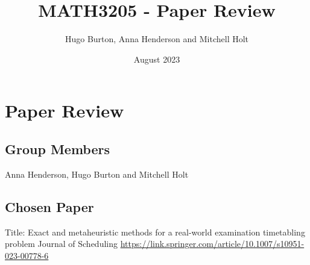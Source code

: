 \usepackage{geometry}
\setlength{\parindent}{0pt}
\title{MATH3205 - Paper Review}
\author{Hugo Burton, Anna Henderson and Mitchell Holt}
\date{August 2023}



\maketitle

\section{Paper Review}

\subsection{Group Members}
Anna Henderson, Hugo Burton and Mitchell Holt

\subsection{Chosen Paper}
Title: Exact and metaheuristic methods for a real-world examination timetabling problem
Journal of Scheduling
\url{https://link.springer.com/article/10.1007/s10951-023-00778-6}






















